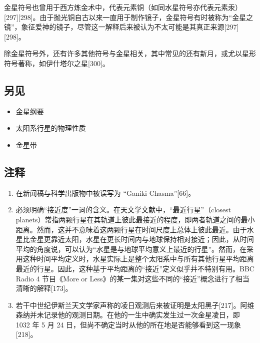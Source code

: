 金星符号也曾用于西方炼金术中，代表元素铜（如同水星符号亦代表元素汞）[297][298]。由于抛光铜自古以来一直用于制作镜子，金星符号有时被称为“金星之镜”，象征爱神的镜子，尽管这一解释后来被认为不太可能是其真正来源[297][298]。

除金星符号外，还有许多其他符号与金星相关，其中常见的还有新月，或尤以星形符号著称，如伊什塔尔之星[300]。
\subsection{另见}
\begin{itemize}
\item 金星纲要  
\item 太阳系行星的物理性质  
\item 金星带 
\end{itemize} 
\subsection{注释 } 
\begin{enumerate}
\item 在新闻稿与科学出版物中被误写为 “Ganiki Chasma”[66]。  
\item 必须明确“接近度”一词的含义。在天文学文献中，“最近行星”（closest planets）常指两颗行星在其轨道上彼此最接近的程度，即两者轨道之间的最小距离。然而，这并不意味着这两颗行星在时间尺度上总体上彼此最近。由于水星比金星更靠近太阳，水星在更长时间内与地球保持相对接近；因此，从时间平均的角度说，可以认为“水星是与地球平均意义上最近的行星”。然而，在采用这种时间平均定义时，水星实际上是整个太阳系中与所有其他行星平均距离最近的行星。因此，这种基于平均距离的“接近”定义似乎并不特别有用。BBC Radio 4 节目《More or Less》的某一集对这些不同的“接近”概念进行了相当清晰的解释[173]。  
\item 若干中世纪伊斯兰天文学家声称的凌日观测后来被证明是太阳黑子[217]。阿维森纳并未记录他的观测日期。在他的一生中确实发生过一次金星凌日，即 1032 年 5 月 24 日，但尚不确定当时从他的所在地是否能够看到这一现象[218]。
\end{enumerate}
